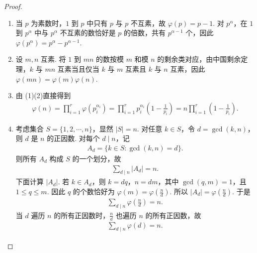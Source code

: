 \documentclass[../../main.tex]{subfiles}%
\begin{document}
\begin{proof}
\begin{enumerate}[(1)]
\item 当 $p$ 为素数时，$1$ 到 $p$ 中只有 $p$ 与 $p$ 不互素，故 $\varphi(p)=p-1$. 对 $p^\alpha$，在 $1$ 到 $p^\alpha$ 中与 $p^\alpha$ 不互素的数恰好是 $p$ 的倍数，共有 $p^{\alpha-1}$ 个，因此 $\varphi(p^\alpha)=p^\alpha-p^{\alpha-1}$.

\item 设 $m,n$ 互素. 将 $1$ 到 $mn$ 的数按模 $m$ 和模 $n$ 的剩余类对应，由中国剩余定理，$k$ 与 $mn$ 互素当且仅当 $k$ 与 $m$ 互素且 $k$ 与 $n$ 互素，因此 $\varphi(mn)=\varphi(m)\varphi(n)$.

\item 由 (1)(2)直接得到
\begin{align*}
\varphi(n)=\prod_{i=1}^r\varphi(p_i^{\alpha_i})
=\prod_{i=1}^r p_i^{\alpha_i}\left(1-\frac1{p_i}\right)
=n\prod_{i=1}^r\left(1-\frac1{p_i}\right).
\end{align*}

\item 考虑集合 $S=\{1,2,\cdots,n\}$，显然 $|S|=n$. 对任意 $k\in S$，令 $d=\gcd(k,n)$，则 $d$ 是 $n$ 的正因数. 对每个 $d\mid n$，记
\begin{align*}
A_d=\{k\in S: \gcd(k,n)=d\}.
\end{align*}
则所有 $A_d$ 构成 $S$ 的一个划分，故
\begin{align*}
\sum_{d\mid n}|A_d|=n.
\end{align*}
下面计算 $|A_d|$. 若 $k\in A_d$，则 $k=dq$，$n=dm$，其中 $\gcd(q,m)=1$，且 $1\leqslant q\leqslant m$. 因此 $q$ 的个数恰好为 $\varphi(m)=\varphi(\frac{n}{d})$. 所以 $|A_d|=\varphi(\frac{n}{d})$. 于是
\begin{align*}
\sum_{d\mid n}\varphi\left(\frac nd\right)=n.
\end{align*}
当 $d$ 遍历 $n$ 的所有正因数时，$\frac{n}{d}$ 也遍历 $n$ 的所有正因数，故
\begin{align*}
\sum_{d\mid n}\varphi(d)=n.
\end{align*}
\end{enumerate}
\end{proof}
\end{document}
